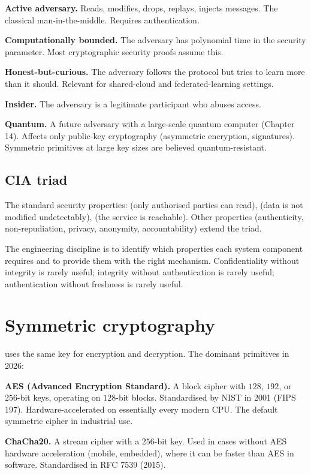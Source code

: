 \textbf{Active adversary.} Reads, modifies, drops, replays, injects messages. The classical man-in-the-middle. Requires authentication.

\textbf{Computationally bounded.} The adversary has polynomial time in the security parameter. Most cryptographic security proofs assume this.

\textbf{Honest-but-curious.} The adversary follows the protocol but tries to learn more than it should. Relevant for shared-cloud and federated-learning settings.

\textbf{Insider.} The adversary is a legitimate participant who abuses access.

\textbf{Quantum.} A future adversary with a large-scale quantum computer (Chapter 14). Affects only public-key cryptography (asymmetric encryption, signatures). Symmetric primitives at large key sizes are believed quantum-resistant.

\subsection{CIA triad}

The standard security properties:  (only authorised parties can read),  (data is not modified undetectably),  (the service is reachable). Other properties (authenticity, non-repudiation, privacy, anonymity, accountability) extend the triad.

The engineering discipline is to identify which properties each system component requires and to provide them with the right mechanism. Confidentiality without integrity is rarely useful; integrity without authentication is rarely useful; authentication without freshness is rarely useful.

\section{Symmetric cryptography}

 uses the same key for encryption and decryption. The dominant primitives in 2026:

\textbf{AES (Advanced Encryption Standard).} A block cipher with $128$, $192$, or $256$-bit keys, operating on $128$-bit blocks. Standardised by NIST in 2001 (FIPS 197). Hardware-accelerated on essentially every modern CPU. The default symmetric cipher in industrial use.

\textbf{ChaCha20.} A stream cipher with a $256$-bit key. Used in cases without AES hardware acceleration (mobile, embedded), where it can be faster than AES in software. Standardised in RFC 7539 (2015).

